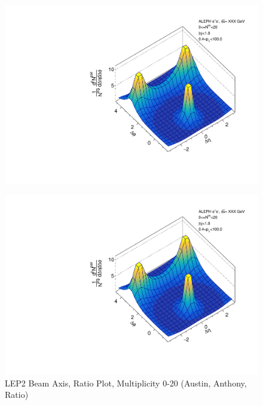 \begin{figure}[htbp]
  \caption{LEP2 Beam Axis, Ratio Plot, Multiplicity 0-20 (Austin, Anthony, Ratio)}
  \begin{minipage}[b]{0.32\linewidth}
    \centering
    \includegraphics[width=\linewidth]{images/TwoParticleCorrelation/LEP2_BEAM/LEP2_BEAM_ratio1_0_20.pdf}
    \label{fig:LEP2 Beam Axis, Ratio Plot, Multiplicity 0-20, Austin}
  \end{minipage}
  \hspace{0.0cm}
  \begin{minipage}[b]{0.32\linewidth}
    \centering
    \includegraphics[width=\linewidth]{images/TwoParticleCorrelation/LEP2_BEAM/LEP2_BEAM_ratio2_0_20.pdf}

\end{minipage}
\end{figure}
